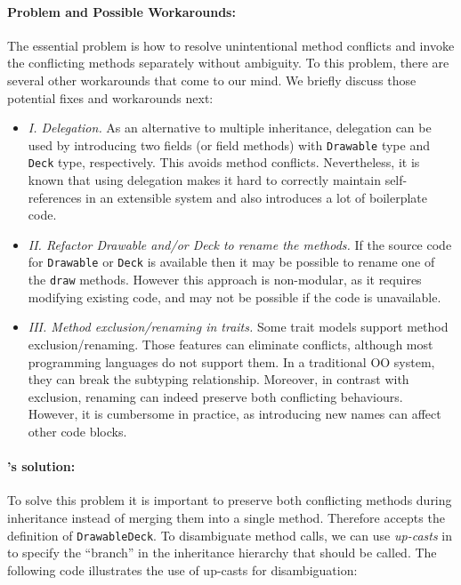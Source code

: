 \paragraph{Problem and Possible Workarounds:} The essential problem is
how to resolve unintentional method conflicts and invoke the
conflicting methods separately without ambiguity. To this problem, there are several other workarounds
that come to our mind. We briefly discuss those potential fixes and
workarounds next:
\begin{itemize}
  \item \textit{I. Delegation.} As an alternative to multiple inheritance,
  delegation can be used by introducing two fields (or field methods) with
  \lstinline|Drawable| type and \lstinline|Deck| type,
  respectively. This avoids method conflicts. Nevertheless, it is known
  that using delegation makes it hard to correctly maintain
  self-references in an extensible system and also
  introduces a lot of boilerplate code.
  \item \textit{II. Refactor Drawable and/or Deck to rename the methods.} If
  the source code for \lstinline|Drawable| or \lstinline|Deck| is available
  then it may be possible to rename one of the \lstinline|draw|
  methods. However this approach is non-modular, as it requires 
  modifying existing code, and may not be possible if the code is unavailable.
  \item \textit{III. Method exclusion/renaming in traits.} Some trait models
  support method exclusion/renaming. Those features
   can eliminate conflicts, although most
  programming languages do not support them. In a traditional OO system,
  they can break the subtyping relationship. Moreover, in
  contrast with exclusion, renaming can indeed preserve both conflicting
  behaviours. However, it is cumbersome in practice, as introducing new
  names can affect other code blocks.
\end{itemize}


\paragraph{\MIM{}'s solution:} To solve this problem it is important to preserve both conflicting methods
during inheritance instead of merging them into a single
method. Therefore \MIM{} accepts the definition of
\lstinline|DrawableDeck|. To disambiguate method calls, 
we can use \emph{up-casts} in \MIM{} to specify the ``branch'' in the
inheritance hierarchy that should be called. The following code
illustrates the use of up-casts for disambiguation:

